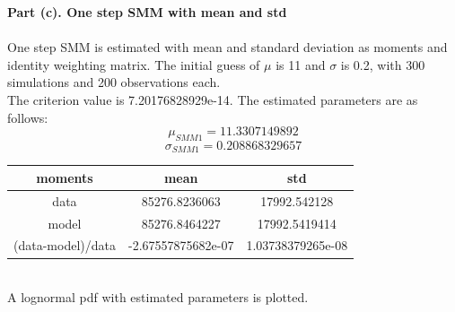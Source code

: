 \documentclass[letterpaper,12pt]{article}
\theoremstyle{definition}
\begin{document}
\clearpage

\noindent\textbf{Part (c). One step SMM with mean and std} \\
\\
One step SMM is estimated with mean and standard deviation as moments and identity weighting matrix. The initial guess of $\mu$ is 11 and $\sigma$ is 0.2, with 300 simulations and 200 observations each.\\
The criterion value is 7.20176828929e-14. The estimated parameters are as follows:
\[\mu_{SMM1}= 11.3307149892\]
\[\sigma_{SMM1}= 0.208868329657\]

\begin{center}
\begin{tabular}{ c|c|c }
 moments & mean & std \\
 \hline
 data & 85276.8236063 & 17992.542128 \\
 model & 85276.8464227 & 17992.5419414 \\
 (data-model)/data & -2.67557875682e-07 & 1.03738379265e-08
\end{tabular}
\end{center}
\\

A lognormal pdf with estimated parameters is plotted. \\

\begin{figure}[htb]\centering\captionsetup{width=6.0in}
  \caption{\textbf{}}
\end{figure} \\
\end{document}
